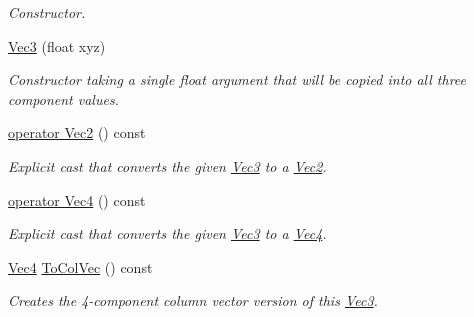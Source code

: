 \begin{DoxyCompactItemize}
\begin{DoxyCompactList}\small\item\em Constructor. \end{DoxyCompactList}\item 
\hyperlink{classgofxmath_1_1_vec3_a7f4f66cef7a64bef3748485833360f62}{Vec3} (float xyz)
\begin{DoxyCompactList}\small\item\em Constructor taking a single float argument that will be copied into all three component values. \end{DoxyCompactList}\item 
\hyperlink{classgofxmath_1_1_vec3_a56486007b902333e096d31fa5a85c424}{operator Vec2} () const 
\begin{DoxyCompactList}\small\item\em Explicit cast that converts the given \hyperlink{classgofxmath_1_1_vec3}{Vec3} to a \hyperlink{classgofxmath_1_1_vec2}{Vec2}. \end{DoxyCompactList}\item 
\hyperlink{classgofxmath_1_1_vec3_ace8614bf15309030f5feabcfc3d69812}{operator Vec4} () const 
\begin{DoxyCompactList}\small\item\em Explicit cast that converts the given \hyperlink{classgofxmath_1_1_vec3}{Vec3} to a \hyperlink{classgofxmath_1_1_vec4}{Vec4}. \end{DoxyCompactList}\item 
\hyperlink{classgofxmath_1_1_vec4}{Vec4} \hyperlink{classgofxmath_1_1_vec3_a0dc737644758a9a7422d9d667ce0ab24}{To\+Col\+Vec} () const 
\begin{DoxyCompactList}\small\item\em Creates the 4-\/component column vector version of this \hyperlink{classgofxmath_1_1_vec3}{Vec3}. \end{DoxyCompactList}\end{DoxyCompactItemize}
